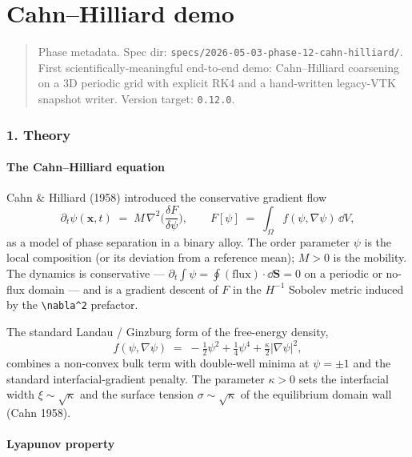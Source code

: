 \chapter{Cahn--Hilliard demo}
\label{chap:dev:cahn-hilliard}

\begin{quote}
Phase metadata. Spec dir:
\passthrough{\lstinline!specs/2026-05-03-phase-12-cahn-hilliard/!}.
First scientifically-meaningful end-to-end demo: Cahn--Hilliard
coarsening on a 3D periodic grid with explicit RK4 and a hand-written
legacy-VTK snapshot writer. Version target:
\passthrough{\lstinline!0.12.0!}.
\end{quote}

\subsection{1. Theory}\label{phase12-theory}

\subsubsection{The Cahn--Hilliard equation}\label{phase12-ch}

Cahn \& Hilliard (1958) introduced the conservative gradient flow
\[
\partial_t\psi(\mathbf x, t) \;=\; M\,\nabla^2\!\Big(\frac{\delta F}{\delta \psi}\Big),
\qquad
F[\psi] \;=\; \int_\Omega f(\psi, \nabla\psi)\,\dd V,
\]
as a model of phase separation in a binary alloy. The order parameter
\(\psi\) is the local composition (or its deviation from a reference
mean); \(M>0\) is the mobility. The dynamics is conservative ---
\(\partial_t\!\int\psi = \oint(\text{flux})\cdot\dd\mathbf S = 0\) on a
periodic or no-flux domain --- and is a gradient descent of \(F\) in
the \(H^{-1}\) Sobolev metric induced by the
\passthrough{\lstinline!\nabla^2!} prefactor.

The standard Landau / Ginzburg form of the free-energy density,
\[
f(\psi, \nabla\psi) \;=\; -\tfrac12\psi^2 + \tfrac14\psi^4 + \tfrac{\kappa}{2}|\nabla\psi|^2,
\]
combines a non-convex bulk term with double-well minima at
\(\psi=\pm 1\) and the standard interfacial-gradient penalty. The
parameter \(\kappa>0\) sets the interfacial width
\(\xi\sim\sqrt{\kappa}\) and the surface tension
\(\sigma\sim\sqrt{\kappa}\) of the equilibrium domain wall (Cahn 1958).

\subsubsection{Lyapunov property}\label{phase12-lyapunov}

